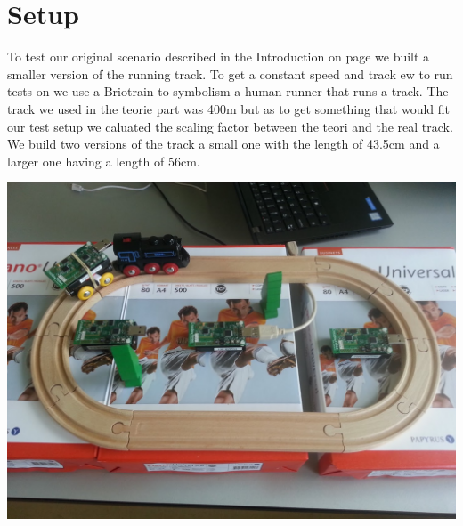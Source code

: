 \section{Setup}\label{sc:setup}
To test our original scenario described in the Introduction on page \pageref{ch:introduction} we built a smaller version of the running track. To get a constant speed and track ew to run tests on we use a Brio\texttrademark train to symbolism a human runner that runs a track. The track we used in the teorie part was 400m but as to get something that would fit our test setup we caluated the scaling factor between the teori and the real track. We build two versions of the track a small one with the length of 43.5cm and a larger one having a length of 56cm. 


\begin{table}[H]
\includegraphics[width=1\linewidth]{testAndPerformance/setup/setup}\label{fig:testSetup}
\end{table}

